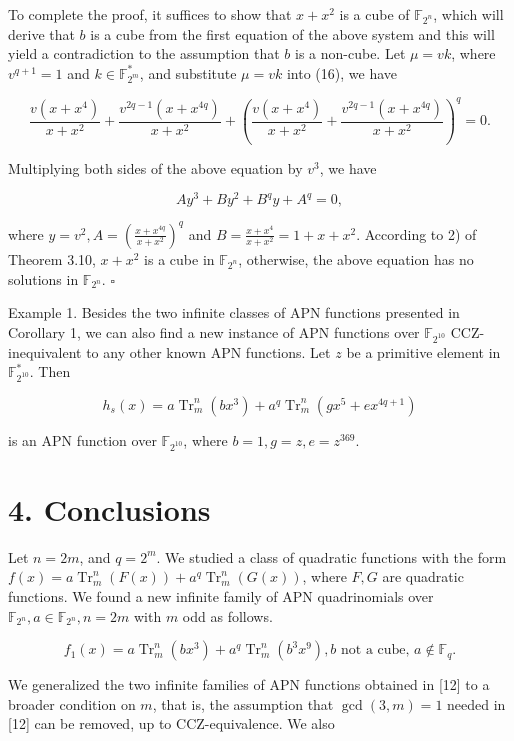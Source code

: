 \documentclass[10pt]{article}
\begin{document}
To complete the proof, it suffices to show that $x+x^{2}$ is a cube of $\mathbb{F}_{2^{n}}$, which will derive that $b$ is a cube from the first equation of the above system and this will yield a contradiction to the assumption that $b$ is a non-cube. Let $\mu=v k$, where $v^{q+1}=1$ and $k \in \mathbb{F}_{2^{m}}^{*}$, and substitute $\mu=v k$ into (16), we have

$$
\frac{v\left(x+x^{4}\right)}{x+x^{2}}+\frac{v^{2 q-1}\left(x+x^{4 q}\right)}{x+x^{2}}+\left(\frac{v\left(x+x^{4}\right)}{x+x^{2}}+\frac{v^{2 q-1}\left(x+x^{4 q}\right)}{x+x^{2}}\right)^{q}=0 .
$$

Multiplying both sides of the above equation by $v^{3}$, we have

$$
A y^{3}+B y^{2}+B^{q} y+A^{q}=0,
$$

where $y=v^{2}, A=\left(\frac{x+x^{4 q}}{x+x^{2}}\right)^{q}$ and $B=\frac{x+x^{4}}{x+x^{2}}=1+x+x^{2}$. According to 2) of Theorem 3.10, $x+x^{2}$ is a cube in $\mathbb{F}_{2^{n}}$, otherwise, the above equation has no solutions in $\mathbb{F}_{2^{n}}$. \(\square\)

Example 1. Besides the two infinite classes of APN functions presented in Corollary 1, we can also find a new instance of APN functions over $\mathbb{F}_{2^{10}}$ CCZ-inequivalent to any other known APN functions. Let $z$ be a primitive element in $\mathbb{F}_{2^{10}}^{*}$. Then

$$
h_{s}(x)=a \operatorname{Tr}_{m}^{n}\left(b x^{3}\right)+a^{q} \operatorname{Tr}_{m}^{n}\left(g x^{5}+e x^{4 q+1}\right)
$$

is an APN function over $\mathbb{F}_{2^{10}}$, where $b=1, g=z, e=z^{369}$.

\section*{4. Conclusions}
Let $n=2 m$, and $q=2^{m}$. We studied a class of quadratic functions with the form $f(x)=a \operatorname{Tr}_{m}^{n}(F(x))+ a^{q} \operatorname{Tr}_{m}^{n}(G(x))$, where $F, G$ are quadratic functions. We found a new infinite family of APN quadrinomials over $\mathbb{F}_{2^{n}}, a \in \mathbb{F}_{2^{n}}, n=2 m$ with $m$ odd as follows.

$$
f_{1}(x)=a \operatorname{Tr}_{m}^{n}\left(b x^{3}\right)+a^{q} \operatorname{Tr}_{m}^{n}\left(b^{3} x^{9}\right), b \text { not a cube, } a \notin \mathbb{F}_{q} .
$$

We generalized the two infinite families of APN functions obtained in [12] to a broader condition on $m$, that is, the assumption that $\operatorname{gcd}(3, m)=1$ needed in [12] can be removed, up to CCZ-equivalence. We also
\end{document}
